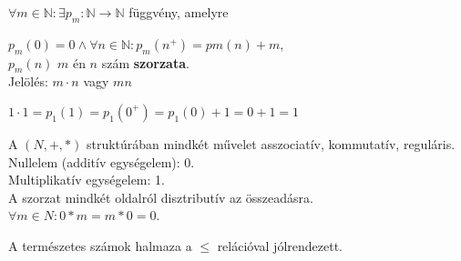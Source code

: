 \begin{frame}
  \begin{tcolorbox}[title={Def.: Szorzás}]
    ${\forall}m \in \mathbb{N} : {\exists} p_m : \mathbb{N} \rightarrow \mathbb{N}$ függvény, amelyre\\
    \mmedskip

    $p_m(0) = 0 \land {\forall}n\in \mathbb{N} : p_m(n^+) = pm(n) + m$,\\
    $p_m(n)$ $m$ én $n$ szám \textbf{szorzata}.\\
    Jelölés: $m \cdot n$ vagy $mn$
  \end{tcolorbox}

  \begin{tcolorbox}[title={Ész}]
    $1 \cdot 1 = p_1(1) = p_1(0^+) = p_1(0) + 1 = 0 + 1 = 1$
  \end{tcolorbox}
\end{frame}

\begin{frame}
  \begin{tcolorbox}[title={Tétel: Természetes számok}]
    A $(N, +, *)$ struktúrában mindkét művelet asszociatív, kommutatív, reguláris.\\
    Nullelem (additív egységelem): 0.\\
    Multiplikatív egységelem: 1.\\
    A szorzat mindkét oldalról disztributív az összeadásra.\\
    ${\forall}m \in N : 0 * m = m * 0 = 0$.
  \end{tcolorbox}
\end{frame}

\begin{frame}
\begin{tcolorbox}[title={Def.: $\mathbb{N}$ rendezése}]
\end{tcolorbox}

\begin{tcolorbox}[title={Tétel: N rendezése}]
A természetes számok halmaza a $\leq$ relációval jólrendezett.
\end{tcolorbox}

\begin{tcolorbox}[title={Def.: Végtelen sorozatok}]
\end{tcolorbox}


\begin{tcolorbox}[title={Ész}]
\end{tcolorbox}
\end{frame}

